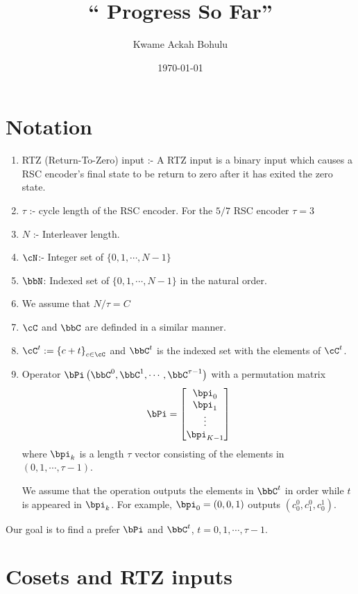 \documentclass[11pt, oneside, dvipdfmx]{book}
\title{``
Progress So Far'' }
\author{Kwame Ackah Bohulu}
\date{\today}
\begin{document}
\maketitle
\section{Notation}
\begin{enumerate}
\item RTZ (Return-To-Zero) input :- A RTZ input is a binary input which causes a RSC encoder's final state to be return to zero after it has exited the zero state.

\item $\tau$ :- cycle length of the RSC encoder. For the $5/7$ RSC encoder $\tau = 3$

\item $N$ :- Interleaver length. 

\item $\cN$:- Integer set of $\{0,1,\cdots,N-1\}$

\item $\bbN$: Indexed set  of $\{0,1,\cdots,N-1\}$ in the natural order.

\item We assume that $N/\tau=C$

\item $\cC$ and $\bbC$ are definded in a similar manner.

\item $\cC^{t}:=\left\{c+t\right\}_{c \in \cC}$ and $\bbC^t$ is the indexed set with the elements of $\cC^t$.

\item Operator $\bPi\left(\bbC^0,\bbC^1,\cdots,\bbC^{\tau-1}\right)$ with a permutation matrix
\[
\bPi = \begin{bmatrix}
\bpi_0\cr
\bpi_1\cr
\vdots\cr
\bpi_{K-1}
\end{bmatrix}
\]
where $\bpi_k$ is a length $\tau$ vector consisting of the elements in $(0,1,\cdots,\tau-1)$. 

We assume that the operation outputs the elements in $\bbC^t$ in order while $t$ is appeared in $\bpi_k$. For example, $\bpi_0 = (0,0,1)$ outputs $(c_0^0,c_1^0,c_0^1)$.
\end{enumerate}

Our goal is to find a prefer $\bPi$ and $\bbC^t$, $t = 0,1,\cdots,\tau-1$.
\section{Cosets and RTZ inputs}
\end{document}

